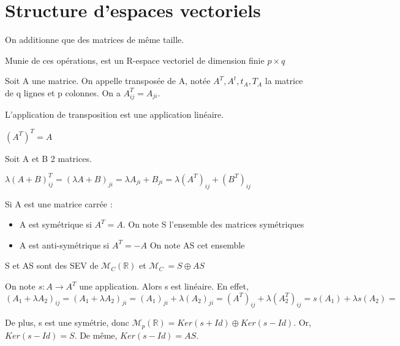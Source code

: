 \documentclass[french]{yLectureNote}
\newcommand{\R}[0]{\mathbb{R}}
\newcommand{\mc}{\mathcal}
\begin{document}
\section{Structure d'espaces vectoriels}
\begin{definition}
On additionne que des matrices de m\^eme taille.
\end{definition}
\begin{proposition}
Munie de ces opérations, est un R-espace vectoriel de dimension finie \(p\times q\)
\end{proposition}
\begin{definition}
Soit A une matrice. On appelle transposée de A, notée \(A^T, A^t, t_A,T_A\) la matrice de q lignes et p colonnes. On a \(A^T_{ij} = A_{ji}\).
\end{definition}
\begin{proposition}
L'application de transposition est une application linéaire.

\((A^T)^T = A\)
\end{proposition}
\begin{myproof}
Soit A et B 2 matrices.

$\lambda (A+B)^T_{ij} = (\lambda A+ B)_{ji} = \lambda A_{ji} + B_{ji} = \lambda (A^T)_{ij} + (B^T)_{ij}$
\end{myproof}
\begin{definition}
Si A est une matrice carrée :
\begin{itemize}
 \item A est symétrique si \(A^T = A\). On note S l'ensemble des matrices symétriques
 \item  A est anti-symétrique si \(A^T = -A\) On note AS cet ensemble
\end{itemize}
\end{definition}
\begin{proposition}
S et AS sont des SEV de \(\mc{M}_C(\R)\) et \(\mc{M}_C\ = S\oplus AS\)
\end{proposition}
\begin{myproof}
 On note \(s : A \to A^T\) une application. Alors s est linéaire. En effet, \((A_1+\lambda A_2)_{ij} = (A_1+\lambda A_2)_{ji} = (A_1)_{ji}+\lambda (A_2)_{ji} = (A^T)_{ij}+\lambda (A_2^T)_{ij} = s(A_1)+\lambda s(A_2) = \)

 De plus, s est une symétrie, donc \(\mc{M}_p(\R) = Ker(s+Id)\oplus Ker(s-Id)\). Or, \(Ker(s-Id) = S\). De m\^eme, \(Ker(s-Id) = AS\).
\end{myproof}
\end{document}
